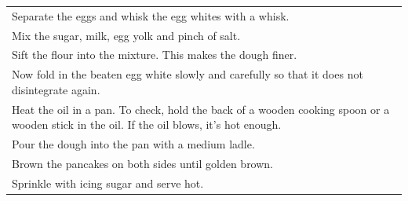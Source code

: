 \begin{tabular}{p{15cm}}
	\\
  Separate the eggs and whisk the egg whites with a whisk.\\
  Mix the sugar, milk, egg yolk and pinch of salt.\\
  Sift the flour into the mixture. This makes the dough finer.\\
  Now fold in the beaten egg white slowly and carefully so that it does not disintegrate again.\\
  Heat the oil in a pan. To check, hold the back of a wooden cooking spoon or a wooden stick in the oil. If the oil blows, it's hot enough.\\
  Pour the dough into the pan with a medium ladle.\\
  Brown the pancakes on both sides until golden brown.\\
  Sprinkle with icing sugar and serve hot.
\end{tabular}

